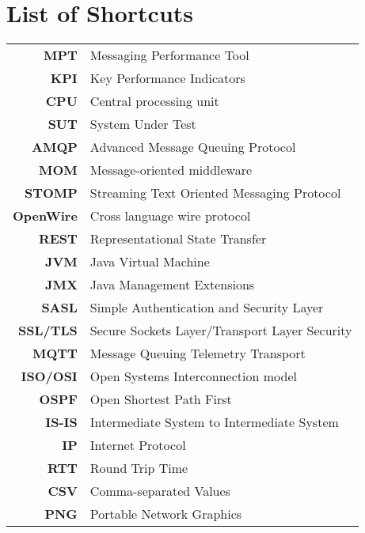 

\chapter*{List of Shortcuts}
\begingroup
\setlength{\tabcolsep}{10pt} %
\renewcommand{\arraystretch}{1.5} %
  \begin{tabular}{rl}
    \textbf{MPT} & Messaging Performance Tool \\
    \textbf{KPI} & Key Performance Indicators \\
    \textbf{CPU} & Central processing unit \\
    \textbf{SUT} & System Under Test \\
    \textbf{AMQP} & Advanced Message Queuing Protocol \\
    \textbf{MOM} & Message-oriented middleware \\
    \textbf{STOMP} & Streaming Text Oriented Messaging Protocol \\
    \textbf{OpenWire} & Cross language wire protocol \\
    \textbf{REST} & Representational State Transfer \\
    \textbf{JVM} & Java Virtual Machine \\
    \textbf{JMX} & Java Management Extensions \\
    \textbf{SASL} & Simple Authentication and Security Layer \\
    \textbf{SSL/TLS} & Secure Sockets Layer/Transport Layer Security \\
    \textbf{MQTT} & Message Queuing Telemetry Transport \\
    \textbf{ISO/OSI} & Open Systems Interconnection model \\
    \textbf{OSPF} & Open Shortest Path First \\
    \textbf{IS-IS} & Intermediate System to Intermediate System \\
    \textbf{IP} & Internet Protocol \\
    \textbf{RTT} & Round Trip Time \\
    \textbf{CSV} & Comma-separated Values \\
    \textbf{PNG} & Portable Network Graphics \\
  \end{tabular}
\endgroup
